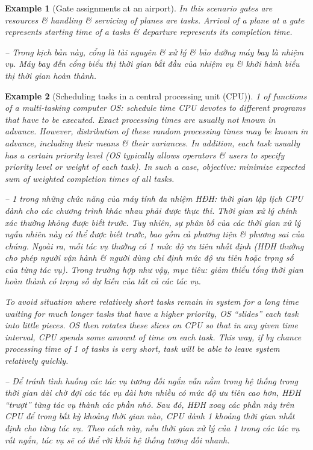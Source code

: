 \documentclass{article}
\newtheorem{example}{Example}
\begin{document}
\begin{itemize}
\begin{itemize}
\begin{example}[Gate assignments at an airport]
            In this scenario gates are resources \& handling \& servicing of planes are tasks. Arrival of a plane at a gate represents starting time of a tasks \& departure represents its completion time.
            
            -- Trong kịch bản này, cổng là tài nguyên \& xử lý \& bảo dưỡng máy bay là nhiệm vụ. Máy bay đến cổng biểu thị thời gian bắt đầu của nhiệm vụ \& khởi hành biểu thị thời gian hoàn thành.            
        \end{example}
        
        \begin{example}[Scheduling tasks in a central processing unit (CPU)]
            1 of functions of a multi-tasking computer OS: schedule time CPU devotes to different programs that have to be executed. Exact processing times are usually not known in advance. However, distribution of these random processing times may be known in advance, including their means \& their variances. In addition, each task usually has a certain priority level (OS typically allows operators \& users to specify priority level or weight of each task). In such a case, objective: minimize expected sum of weighted completion times of all tasks.
            
            -- 1 trong những chức năng của máy tính đa nhiệm HĐH: thời gian lập lịch CPU dành cho các chương trình khác nhau phải được thực thi. Thời gian xử lý chính xác thường không được biết trước. Tuy nhiên, sự phân bố của các thời gian xử lý ngẫu nhiên này có thể được biết trước, bao gồm cả phương tiện \& phương sai của chúng. Ngoài ra, mỗi tác vụ thường có 1 mức độ ưu tiên nhất định (HĐH thường cho phép người vận hành \& người dùng chỉ định mức độ ưu tiên hoặc trọng số của từng tác vụ). Trong trường hợp như vậy, mục tiêu: giảm thiểu tổng thời gian hoàn thành có trọng số dự kiến của tất cả các tác vụ.
            
            To avoid situation where relatively short tasks remain in system for a long time waiting for much longer tasks that have a higher priority, OS ``slides'' each task into little pieces. OS then rotates these slices on CPU so that in any given time interval, CPU spends some amount of time on each task. This way, if by chance processing time of 1 of tasks is very short, task will be able to leave system relatively quickly.
            
            -- Để tránh tình huống các tác vụ tương đối ngắn vẫn nằm trong hệ thống trong thời gian dài chờ đợi các tác vụ dài hơn nhiều có mức độ ưu tiên cao hơn, HĐH ``trượt'' từng tác vụ thành các phần nhỏ. Sau đó, HĐH xoay các phần này trên CPU để trong bất kỳ khoảng thời gian nào, CPU dành 1 khoảng thời gian nhất định cho từng tác vụ. Theo cách này, nếu thời gian xử lý của 1 trong các tác vụ rất ngắn, tác vụ sẽ có thể rời khỏi hệ thống tương đối nhanh.
            

\end{example}
\end{itemize}
\end{itemize}
\end{document}

